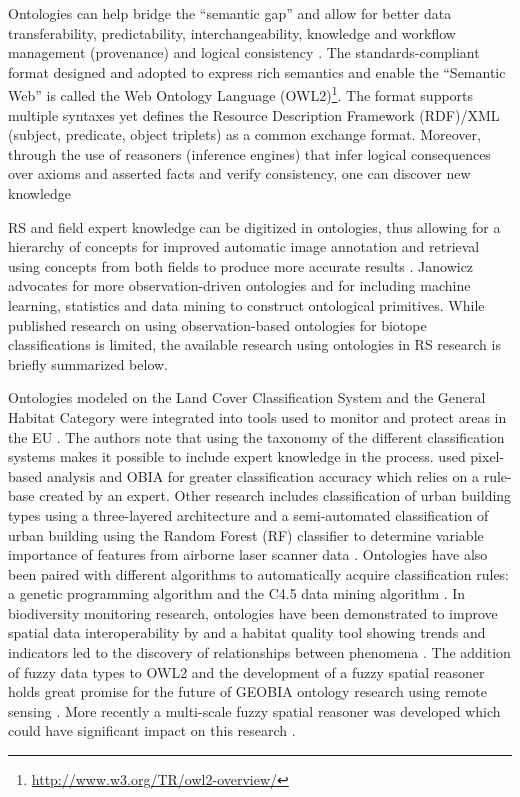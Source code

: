 \documentclass[authoryear, review,12pt,number]{elsarticle}
\begin{document}
Ontologies can help bridge the ``semantic gap'' and allow for better data
transferability, predictability, interchangeability, knowledge and workflow
management (provenance) and logical consistency \citep{Janowicz2012}.  The
standards-compliant format designed and adopted to express rich semantics and
enable the ``Semantic Web'' is called the Web Ontology Language
(OWL2)\footnote{\url{http://www.w3.org/TR/owl2-overview/}}. The format supports
multiple syntaxes yet defines the Resource Description Framework (RDF)/XML
(subject, predicate, object triplets) as a common exchange format.  Moreover,
through the use of reasoners (inference engines) that infer logical consequences
over axioms and asserted facts and verify consistency, one can discover new
knowledge \citep{Arvor2013, Andres2013a}

RS and field expert knowledge can be digitized in ontologies, thus allowing for
a hierarchy of concepts for improved automatic image annotation and retrieval
using concepts from both fields to produce more accurate results
\citep{Srikanth_2005}. Janowicz \cite{Janowicz2012} advocates for more
observation-driven ontologies and for including machine learning, statistics and
data mining to construct ontological primitives. While published research on
using observation-based ontologies for biotope classifications is limited, the
available research using ontologies in RS research is briefly summarized below.

Ontologies modeled on the Land Cover Classification System and the General
Habitat Category were integrated into tools used to monitor and protect areas in
the EU \citep{Arvor2013}. The authors note that using the taxonomy of the
different classification systems makes it possible to include expert knowledge
in the process. \cite{Lucas2015} used pixel-based analysis and OBIA for greater
classification accuracy which relies on a rule-base created by an expert. Other
research includes classification of urban building types using a three-layered
architecture \citep{diSciascio2013} and a semi-automated classification of urban
building using the Random Forest (RF) classifier to determine variable
importance of features from airborne laser scanner data \citep{Belgiu2014}.
Ontologies have also been paired with different algorithms to automatically
acquire classification rules: a genetic programming algorithm
\citep{Forestier2012470} and the C4.5 data mining algorithm
\citep{Sheeren2006ML}. In biodiversity monitoring research, ontologies have been
demonstrated to improve spatial data interoperability by \cite{Nieland2015} and
a habitat quality tool showing trends and indicators led to the discovery of
relationships between phenomena \citep{Perez-Luque2015}.  The addition of fuzzy
data types to OWL2 and the development of a fuzzy spatial reasoner holds great
promise for the future of GEOBIA ontology research using remote sensing
\citep{Bobillo2011, Bobillo2015}. More recently a multi-scale fuzzy spatial
reasoner was developed which could have significant impact on this research
\citep{Argyridis2015}.
\end{document}
